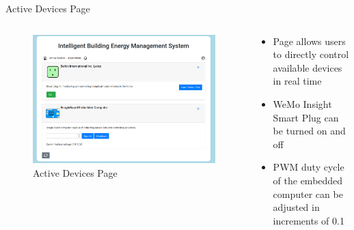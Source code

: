 \documentclass{beamer}
\begin{document}
\begin{frame}{Active Devices Page}{} %
    \begin{columns}
      \begin{figure}
            \centering
            \includegraphics[scale=0.13]{figs/ActiveDevices_screen.png}
            \caption{Active Devices Page}
            \label{fig:active_devices}
        \end{figure}
        \begin{block}{}
          \begin{itemize}
            \item Page allows users to directly control available devices in real time
            \item WeMo Insight Smart Plug can be turned on and off
            \item PWM duty cycle of the embedded computer can be adjusted in increments of 0.1
        \end{itemize}
        \end{block}
    \end{columns}
\end{frame}
\end{document}
